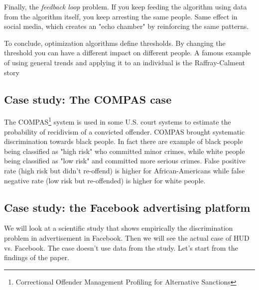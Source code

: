 Finally, the \textit{feedback loop} problem. If you keep feeding the algorithm using data from the algorithm itself, you keep arresting the same people. Same effect in social media, which creates an "echo chamber" by reinforcing the same patterns.

To conclude, optimization algorithms define thresholds. By changing the threshold you can have a different impact on different people. A famous example of using general trends and applying it to an individual is the Raffray-Calment story

\subsection{Case study: The COMPAS case}
The COMPAS\footnote{Correctional Offender Management Profiling for Alternative Sanctions} system is used in some U.S. court systems to estimate the probability of recidivism of a convicted offender.
COMPAS brought systematic discrimination towards black people. In fact there are example of black people being classified as "high risk" who committed minor crimes, while white people being classified  as "low risk" and committed more serious crimes. False positive rate (high risk but didn't re-offend) is higher for African-Americans while false negative rate (low risk but re-offended) is higher for white people.

\subsection{Case study: the Facebook advertising platform}
We will look at a scientific study that shows empirically the discrimination problem in advertisement in Facebook. Then we will see the actual case of HUD vs. Facebook. The case doesn't use data from the study. Let's start from the findings of the paper.
